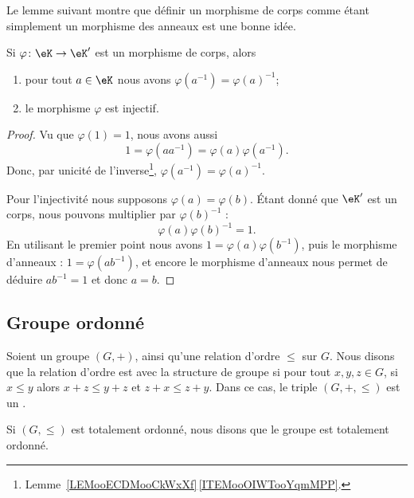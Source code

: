 Le lemme suivant montre que définir un morphisme de corps comme étant simplement un morphisme des anneaux est une bonne idée.
\begin{lemma}       \label{LEMooWBOPooZnsZgQ}
	Si \( \varphi\colon \eK\to \eK'\) est un morphisme de corps, alors
	\begin{enumerate}
		\item
		      pour tout \( a\in \eK\) nous avons \( \varphi(a^{-1})=\varphi(a)^{-1}\);
		\item
		      le morphisme \( \varphi\) est injectif.
	\end{enumerate}
\end{lemma}

\begin{proof}
	Vu que \( \varphi(1)=1\), nous avons aussi
	\begin{equation}
		1=\varphi(aa^{-1})=\varphi(a)\varphi(a^{-1}).
	\end{equation}
	Donc, par unicité de l'inverse\footnote{Lemme~\ref{LEMooECDMooCkWxXf}\,\ref{ITEMooOIWTooYqmMPP}.}, \( \varphi(a^{-1})=\varphi(a)^{-1}\).

	Pour l'injectivité nous supposons \( \varphi(a)=\varphi(b)\). Étant donné que \( \eK'\) est un corps, nous pouvons multiplier par \( \varphi(b)^{-1}\) :
	\begin{equation}
		\varphi(a)\varphi(b)^{-1}=1.
	\end{equation}
	En utilisant le premier point nous avons \( 1=\varphi(a)\varphi(b^{-1})\), puis le morphisme d'anneaux : \( 1=\varphi(ab^{-1})\), et encore le morphisme d'anneaux nous permet de déduire \( ab^{-1}=1\) et donc \(a=b\).
\end{proof}





\subsection{Groupe ordonné}

\begin{definition}        \label{DEFooEUHFooYvhnLQ}
	Soient un groupe \( (G,+)\), ainsi qu'une relation d'ordre \( \leq\) sur \( G\). Nous disons que la relation d'ordre est  avec la structure de groupe si pour tout \( x,y,z\in G\), si \( x\leq y\) alors \( x+z\leq y+z\) et \( z+x\leq z+y\). Dans ce cas, le triple \( (G,+,\leq)\) est un .

	Si \( (G,\leq)\) est totalement ordonné, nous disons que le groupe est totalement ordonné.
\end{definition}


